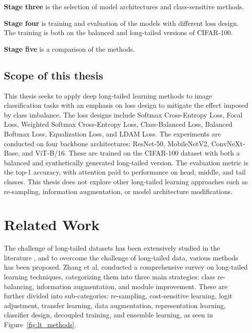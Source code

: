 \noindent \textbf{Stage three} is the selection of model architectures and class-sensitive methods.
\vspace{1em}

\noindent \textbf{Stage four} is training and evaluation of the models with different loss design. The training is both on the balanced and long-tailed versions of CIFAR-100.
\vspace{1em}

\noindent \textbf{Stage five} is a comparison of the methods.
\vspace{1em}



\subsection{Scope of this thesis}
This thesis seeks to apply deep long-tailed learning methods to image classification tasks with an emphasis on loss design to mitigate the effect imposed by class imbalance. The loss designs include Softmax Cross-Entropy Loss, Focal Loss, Weighted Softmax Cross-Entropy Loss, Class-Balanced Loss, Balanced Boftmax Loss, Equalization Loss, and LDAM Loss. The experiments are conducted on four backbone architectures: ResNet-50, MobileNetV2, ConvNeXt-Base, and ViT-B/16. These are trained on the CIFAR-100 dataset with both a balanced and synthetically generated long-tailed version. The evaluation metric is the top-1 accuracy, with attention paid to performance on head, middle, and tail classes. This thesis does not explore other long-tailed learning approaches such as re-sampling, information augmentation, or model architecture modifications.




\section{Related Work}
The challenge of long-tailed datasets has been extensively studied in the literature \cite{zhang2023deep,zhang2024systematicreviewlongtailedlearning}, and to overcome the challenge of long-tailed data, various methods has been proposed. Zhang et al. \cite{zhang2023deep} conducted a comprehensive survey on long-tailed learning techniques, categorizing them into three main strategies: class re-balancing, information augmentation, and module improvement. These are further divided into sub-categories: re-sampling, cost-sensitive learning, logit adjustment, transfer learning, data augmentation, representation learning, classifier design, decoupled training, and ensemble learning, as seen in Figure~\ref{fig:lt_methods}. 

